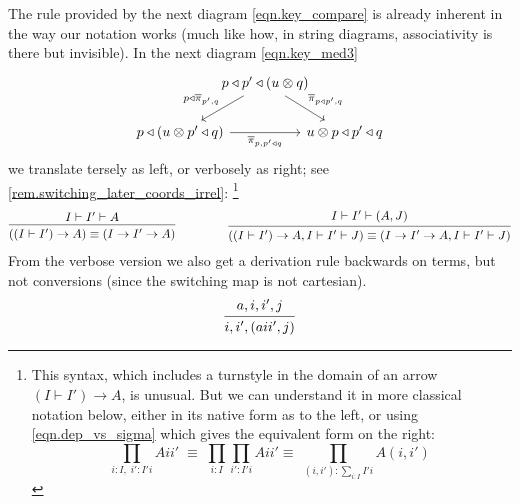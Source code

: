 \documentclass[11pt, one side, article]{memoir}
\theoremstyle{definition}
\theoremstyle{plain}
\newcommand{\ol}[1]{\overline{#1}}
\newcommand{\0}{\textsf{0}}
\newcommand{\1}{\tn{\textsf{1}}}
\newcommand{\tri}{\mathbin{\triangleleft}}
\newcommand{\switch}{\pi}
\begin{document}
The rule provided by the next diagram \eqref{eqn.key_compare} is already inherent in the way our notation works (much like how, in string diagrams, associativity is there but invisible). In the next diagram \eqref{eqn.key_med3}
\[
\begin{tikzcd}[column sep=-10pt, ampersand replacement=\&]
	\&p\tri p'\tri (u\otimes q)\ar[dl, "p\tri\ol\switch_{p',q}"']\ar[dr,"\ol\switch_{p\tri p',q}"]\\
	p\tri (u\otimes p'\tri q)\ar[rr, "\ol\switch_{p, p'\tri q}"']\&\&u\otimes p\tri p'\tri q
\end{tikzcd}
\]
we translate tersely as left, or verbosely as right; see \cref{rem.switching_later_coords_irrel}:%
\footnote{
This syntax, which includes a turnstyle in the domain of an arrow $(I\vdash I')\to A$, is unusual. But we can understand it in more classical notation below, either in its native form as to the left, or using \cref{eqn.dep_vs_sigma} which gives the equivalent form on the right:
\[
  \prod_{i:I,\; i':I' i}A i i'\;
  \equiv\;
  \prod_{i:I}\prod_{i':I' i}A i i'
  \equiv\;
  \prod_{(i,i'):\sum_{i:I}I' i}A (i,i')\;
\]
}
\[
  \begin{prooftree}
    \Hypo{I\vdash I'\vdash A}
    \Infer1{((I\vdash I')\to A)\equiv (I\to I'\to A)}
  \end{prooftree}
\hspace{.6in}
  \begin{prooftree}
    \Hypo{I\vdash I'\vdash (A,J)}
    \Infer1{((I\vdash I')\to A,I\vdash I'\vdash J)\equiv (I\to I'\to A, I\vdash I'\vdash J)}
  \end{prooftree}
\]
From the verbose version we also get a derivation rule backwards on terms, but not conversions (since the switching map is not cartesian).
\[
  \begin{prooftree}
    \Hypo{a,i,i',j}
    \Infer1{i,i',(a i i', j)}
  \end{prooftree}
\]
\end{document}
